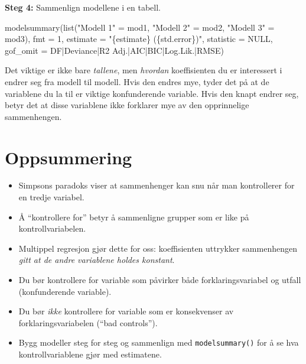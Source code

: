 \documentclass[
  norsk,
  letterpaper,
  DIV=11,
  numbers=noendperiod]{scrreprt}
\newenvironment{Shaded}{\begin{snugshade}}{\end{snugshade}}
\newcommand{\AttributeTok}[1]{\textcolor[rgb]{0.40,0.45,0.13}{#1}}
\newcommand{\ConstantTok}[1]{\textcolor[rgb]{0.56,0.35,0.01}{#1}}
\newcommand{\DecValTok}[1]{\textcolor[rgb]{0.68,0.00,0.00}{#1}}
\newcommand{\FunctionTok}[1]{\textcolor[rgb]{0.28,0.35,0.67}{#1}}
\newcommand{\NormalTok}[1]{\textcolor[rgb]{0.00,0.23,0.31}{#1}}
\newcommand{\OtherTok}[1]{\textcolor[rgb]{0.00,0.23,0.31}{#1}}
\newcommand{\StringTok}[1]{\textcolor[rgb]{0.13,0.47,0.30}{#1}}
\providecommand{\tightlist}{%
  \setlength{\itemsep}{0pt}\setlength{\parskip}{0pt}}
\theoremstyle{definition}
\theoremstyle{remark}
\begin{document}
\textbf{Steg 4:} Sammenlign modellene i en tabell.

\begin{Shaded}
\begin{Highlighting}[]
\FunctionTok{modelsummary}\NormalTok{(}\FunctionTok{list}\NormalTok{(}\StringTok{"Modell 1"} \OtherTok{=}\NormalTok{ mod1,}
                  \StringTok{"Modell 2"} \OtherTok{=}\NormalTok{ mod2,}
                  \StringTok{"Modell 3"} \OtherTok{=}\NormalTok{ mod3),}
             \AttributeTok{fmt =} \DecValTok{1}\NormalTok{,}
             \AttributeTok{estimate =} \StringTok{"\{estimate\} (\{std.error\})"}\NormalTok{,}
             \AttributeTok{statistic =} \ConstantTok{NULL}\NormalTok{,}
             \AttributeTok{gof\_omit =} \StringTok{\textquotesingle{}DF|Deviance|R2 Adj.|AIC|BIC|Log.Lik.|RMSE\textquotesingle{}}\NormalTok{)}
\end{Highlighting}
\end{Shaded}

Det viktige er ikke bare \emph{tallene}, men \emph{hvordan}
koeffisienten du er interessert i endrer seg fra modell til modell. Hvis
den endres mye, tyder det på at de variablene du la til er viktige
konfunderende variable. Hvis den knapt endrer seg, betyr det at disse
variablene ikke forklarer mye av den opprinnelige sammenhengen.

\section{Oppsummering}\label{oppsummering-3}

\begin{itemize}
\tightlist
\item
  Simpsons paradoks viser at sammenhenger kan snu når man kontrollerer
  for en tredje variabel.
\item
  Å ``kontrollere for'' betyr å sammenligne grupper som er like på
  kontrollvariabelen.
\item
  Multippel regresjon gjør dette for oss: koeffisienten uttrykker
  sammenhengen \emph{gitt at de andre variablene holdes konstant}.
\item
  Du bør kontrollere for variable som påvirker både forklaringsvariabel
  og utfall (konfunderende variable).
\item
  Du bør \emph{ikke} kontrollere for variable som er konsekvenser av
  forklaringsvariabelen (``bad controls'').
\item
  Bygg modeller steg for steg og sammenlign med \texttt{modelsummary()}
  for å se hva kontrollvariablene gjør med estimatene.
\end{itemize}
\end{document}
